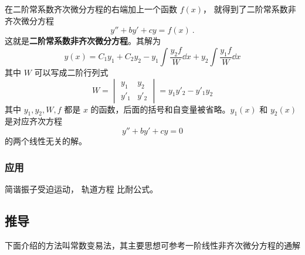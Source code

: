 


在二阶常系数齐次微分方程的右端加上一个函数 $f(x)$， 就得到了二阶常系数非齐次微分方程
\begin{equation}\label{eq_Ode2N_1}
y'' + by' + cy = f(x)~.
\end{equation}
这就是\textbf{二阶常系数非齐次微分方程}。其解为
\begin{equation}
y(x) = C_1 y_1 + C_2 y_2 - y_1\int \frac{y_2 f}{W} \dd{x} + y_2\int \frac{y_1 f}{W} \dd{x}
\end{equation}
其中 $W$ 可以写成二阶行列式
\begin{equation}
W = 
\begin{vmatrix}
y_1 & y_2\\
y'_1 & y'_2
\end{vmatrix} = y_1 y'_2 - y'_1 y_2
\end{equation}
其中 $y_1, y_2, W, f$ 都是 $x$ 的函数，后面的括号和自变量被省略。$y_1(x)$ 和 $y_2(x)$ 是对应齐次方程 
\begin{equation}\label{eq_Ode2N_4}
y'' + by' + cy = 0
\end{equation}
的两个线性无关的解。

\subsubsection{应用}
简谐振子受迫运动， 轨道方程 比耐公式。

\subsection{推导}

下面介绍的方法叫常数变易法，其主要思想可参考一阶线性非齐次微分方程的通解%

